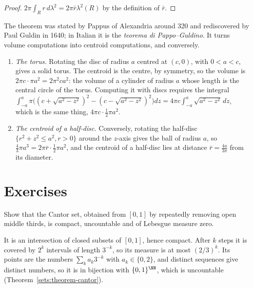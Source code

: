 \begin{proof}
$2\pi\int_Rr\,d\lambda^2 = 2\pi\bar r\lambda^2(R)$ by the definition of $\bar r$.
\end{proof}

The theorem was stated by Pappus of Alexandria around 320 and rediscovered by Paul Guldin in 1640; in Italian it is the \emph{teorema di Pappo--Guldino}. It turns volume computations into centroid
computations, and conversely.

\begin{example}\label{measure-theory:example-pappus-volume}
\begin{enumerate}
\item \emph{The torus.} Rotating the disc of radius $a$ centred at $(c, 0)$, with $0 < a < c$, gives a solid torus. The centroid is the centre, by symmetry, so the volume is $2\pi c \cdot \pi a^2 = 2\pi^2ca^2$: the
volume of a cylinder of radius $a$ whose length is the central circle of the torus. Computing it with discs requires the integral $\int_{-a}^a\pi\bigl((c + \sqrt{a^2 - z^2})^2 - (c - \sqrt{a^2 - z^2})^2\bigr)dz =
4\pi c\int_{-a}^a\sqrt{a^2 - z^2}\,dz$, which is the same thing, $4\pi c \cdot \frac12\pi a^2$.
\item \emph{The centroid of a half-disc.} Conversely, rotating the half-disc $\{r^2 + z^2 \leq a^2, r > 0\}$ around the $z$-axis gives the ball of radius $a$, so $\frac43\pi a^3 = 2\pi\bar r \cdot \frac12\pi a^2$, and the
centroid of a half-disc lies at distance $\bar r = \frac{4a}{3\pi}$ from its diameter.
\end{enumerate}
\end{example}

\section{Exercises}\label{measure-theory:section-exercises}

\begin{exercise}\label{measure-theory:exercise-cantor}
Show that the Cantor set, obtained from $[0, 1]$ by repeatedly removing open middle thirds, is compact, uncountable and of Lebesgue measure zero.
\end{exercise}

\begin{solution}
It is an intersection of closed subsets of $[0, 1]$, hence compact. After $k$ steps it is covered by $2^k$ intervals of length $3^{-k}$, so its measure is at most $(2/3)^k$. Its points are the numbers
$\sum_k a_k3^{-k}$ with $a_k \in \{0, 2\}$, and distinct sequences give distinct numbers, so it is in bijection with $\{0, 1\}^{\NN}$, which is uncountable (Theorem~\ref{sets:theorem-cantor}).
\end{solution}

